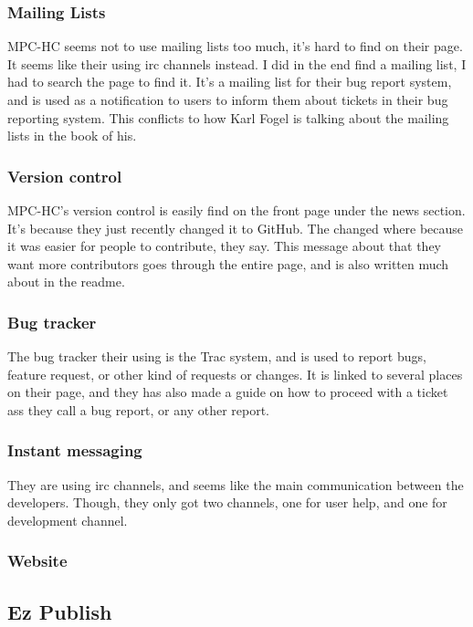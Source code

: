 \documentclass{report} %
\begin{document}
\subsubsection{Mailing Lists}
MPC-HC seems not to use mailing lists too much, it's hard to find on their page. It seems like their using irc channels instead. I did in the end find a mailing list, I had to search the page to find it. It's a mailing list for their bug report system, and is used as a notification to users to inform them about tickets in their bug reporting system\cite{mpctracsupport}\cite{mpctracmail}. This conflicts to how Karl Fogel is talking about the mailing lists in the book\cite{kfposs} of his. %
\subsubsection{Version control}
MPC-HC's version control is easily find on the front page\cite{mpcweb} under the news section. It's because they just recently changed it to GitHub. The changed where because it was easier for people to contribute, they say. This message about that they want more contributors goes through the entire page, and is also written much about in the readme\cite{mpcsource}.
\subsubsection{Bug tracker}
The bug tracker their using is the Trac\cite{tracweb} system, and is used to report bugs, feature request, or other kind of requests or changes. It is linked to several places on their page, and they has also made a guide%
on how to proceed with a ticket ass they call a bug report, or any other report. 
\subsubsection{Instant messaging}
They are using irc channels, and seems like the main communication between the developers. Though, they only got two channels, one for user help, and one for development channel.
\subsubsection{Website}

\subsection{Ez Publish}
\end{document}
